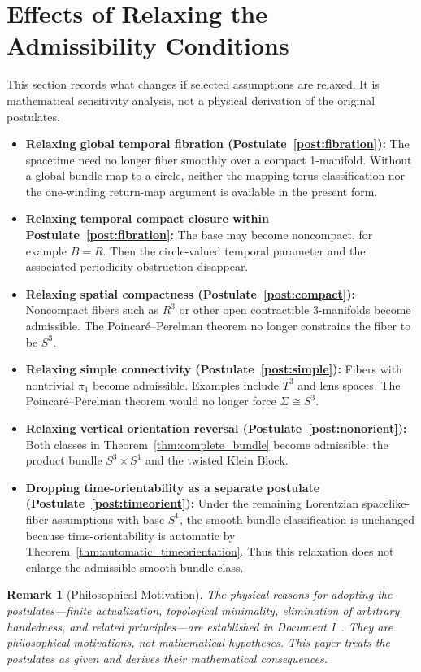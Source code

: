 \documentclass[11pt]{article}
\theoremstyle{canonmath}
\newtheorem{remark}[theorem]{Remark}
\theoremstyle{canonpostulate}
\theoremstyle{canonproposition}
\providecommand{\R}{\mathbb{R}}
\providecommand{\Sone}{S^1}
\providecommand{\Sthree}{S^3}
\def\mathbb#1{#1}%
\begin{document}
\section{Effects of Relaxing the Admissibility Conditions}

This section records what changes if selected assumptions are relaxed. It is mathematical sensitivity analysis, not a physical derivation of the original postulates.

\begin{itemize}
    \item \textbf{Relaxing global temporal fibration (Postulate~\ref{post:fibration}):} The spacetime need no longer fiber smoothly over a compact 1-manifold. Without a global bundle map to a circle, neither the mapping-torus classification nor the one-winding return-map argument is available in the present form.
    \item \textbf{Relaxing temporal compact closure within Postulate~\ref{post:fibration}:} The base may become noncompact, for example $B=\R$. Then the circle-valued temporal parameter and the associated periodicity obstruction disappear.
    \item \textbf{Relaxing spatial compactness (Postulate~\ref{post:compact}):} Noncompact fibers such as $\R^3$ or other open contractible 3-manifolds become admissible. The Poincar\'e--Perelman theorem no longer constrains the fiber to be $\Sthree$.
    \item \textbf{Relaxing simple connectivity (Postulate~\ref{post:simple}):} Fibers with nontrivial $\pi_1$ become admissible. Examples include $T^3$ and lens spaces. The Poincar\'e--Perelman theorem would no longer force $\Sigma\cong\Sthree$.
    \item \textbf{Relaxing vertical orientation reversal (Postulate~\ref{post:nonorient}):} Both classes in Theorem~\ref{thm:complete_bundle} become admissible: the product bundle $\Sthree\times\Sone$ and the twisted Klein Block.
    \item \textbf{Dropping time-orientability as a separate postulate (Postulate~\ref{post:timeorient}):} Under the remaining Lorentzian spacelike-fiber assumptions with base $\Sone$, the smooth bundle classification is unchanged because time-orientability is automatic by Theorem~\ref{thm:automatic_timeorientation}. Thus this relaxation does not enlarge the admissible smooth bundle class.
\end{itemize}

\begin{remark}[Philosophical Motivation]
The physical reasons for adopting the postulates---finite actualization, topological minimality, elimination of arbitrary handedness, and related principles---are established in Document I~\cite{CanonWhy}. They are philosophical motivations, not mathematical hypotheses. This paper treats the postulates as given and derives their mathematical consequences.
\end{remark}
\end{document}
